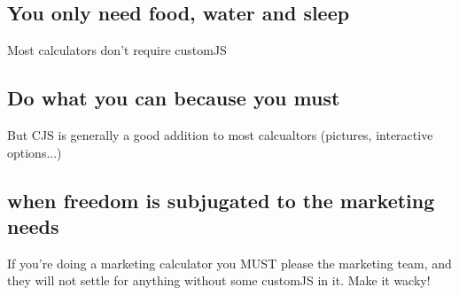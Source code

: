 \subsection{You only need food, water and sleep}
\label{sub:need}
Most calculators don't require customJS

\subsection{Do what you can because you must}
\label{sub:whenToCJS}
But CJS is generally a good addition to most calcualtors (pictures, interactive options...)

\subsection{when freedom is subjugated to the marketing needs}
\label{sub:marketing}
If you're doing a marketing calculator you MUST please the marketing team, and they will not settle for anything without some customJS in it. Make it wacky!



    
